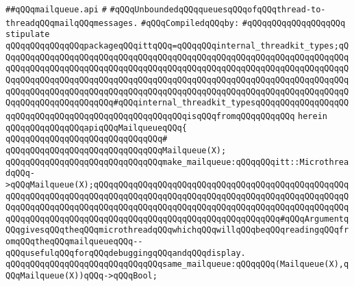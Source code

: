 \label{src/lib/src/lib/thread-kit/src/core-thread-kit/mailqueue.api}
\verb|##qQQqmailqueue.api|\newline
\verb|#|\newline
\verb|#qQQqUnboundedqQQqqueuesqQQqofqQQqthread-to-threadqQQqmailqQQqmessages.|\newline
\newline
\verb|#qQQqCompiledqQQqby:|\newline
\verb|#qQQqqQQqqQQqqQQqqQQq|\newline
\newline
\newline
\newline
\newline
\verb|stipulate|\newline
\verb|qQQqqQQqqQQqqQQqpackageqQQqittqQQq=qQQqqQQqinternal_threadkit_types;qQQqqQQqqQQqqQQqqQQqqQQqqQQqqQQqqQQqqQQqqQQqqQQqqQQqqQQqqQQqqQQqqQQqqQQqqQQqqQQqqQQqqQQqqQQqqQQqqQQqqQQqqQQqqQQqqQQqqQQqqQQqqQQqqQQqqQQqqQQqqQQqqQQqqQQqqQQqqQQqqQQqqQQqqQQqqQQqqQQqqQQqqQQqqQQqqQQqqQQqqQQqqQQqqQQqqQQqqQQqqQQqqQQqqQQqqQQqqQQqqQQqqQQqqQQqqQQqqQQqqQQqqQQqqQQqqQQqqQQqqQQqqQQqqQQqqQQqqQQqqQQq#qQQqinternal_threadkit_typesqQQqqQQqqQQqqQQqqQQqqQQqqQQqqQQqqQQqqQQqqQQqqQQqqQQqqQQqisqQQqfromqQQqqQQqqQQq|\newline
\verb|herein|\newline
\verb|qQQqqQQqqQQqqQQqapiqQQqMailqueueqQQq{|\newline
\verb|qQQqqQQqqQQqqQQqqQQqqQQqqQQqqQQq#|\newline
\verb|qQQqqQQqqQQqqQQqqQQqqQQqqQQqqQQqMailqueue(X);|\newline
\newline
\verb|qQQqqQQqqQQqqQQqqQQqqQQqqQQqqQQqmake_mailqueue:qQQqqQQqitt::MicrothreadqQQq->qQQqMailqueue(X);qQQqqQQqqQQqqQQqqQQqqQQqqQQqqQQqqQQqqQQqqQQqqQQqqQQqqQQqqQQqqQQqqQQqqQQqqQQqqQQqqQQqqQQqqQQqqQQqqQQqqQQqqQQqqQQqqQQqqQQqqQQqqQQqqQQqqQQqqQQqqQQqqQQqqQQqqQQqqQQqqQQqqQQqqQQqqQQqqQQqqQQqqQQqqQQqqQQqqQQqqQQqqQQqqQQqqQQqqQQqqQQqqQQqqQQqqQQqqQQqqQQqqQQq#qQQqArgumentqQQqgivesqQQqtheqQQqmicrothreadqQQqwhichqQQqwillqQQqbeqQQqreadingqQQqfromqQQqtheqQQqmailqueueqQQq--qQQqusefulqQQqforqQQqdebuggingqQQqandqQQqdisplay.|\newline
\newline
\verb|qQQqqQQqqQQqqQQqqQQqqQQqqQQqqQQqsame_mailqueue:qQQqqQQq(Mailqueue(X),qQQqMailqueue(X))qQQq->qQQqBool;|\newline
